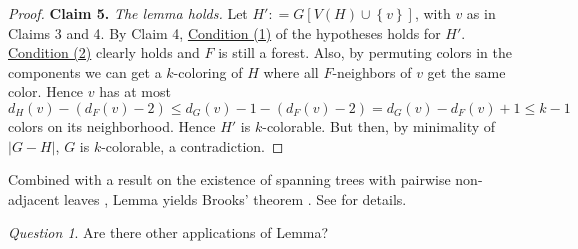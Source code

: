 \documentclass[12pt]{article}
\theoremstyle{plain}
\theoremstyle{definition}
\theoremstyle{remark}
\newtheorem*{question}{Question}
\newcommand{\set}[1]{\left\{ #1 \right\}}
\newcommand{\DefinedAs}{\mathrel{\mathop:}=}
\newcommand{\CondOne}{\hyperref[cond1]{Condition (1)}}
\newcommand{\CondTwo}{\hyperref[cond2]{Condition (2)}}
\begin{document}
\begin{proof}
\textbf{Claim 5.} \textit{The lemma holds.}
Let $H' \DefinedAs G[V(H) \cup \set{v}]$, with $v$ as in Claims 3 and 4.  
By Claim 4, {\CondOne} of the
hypotheses holds for $H'$. {\CondTwo} clearly holds and $F$ is still a forest. Also, by permuting colors in the components we can get a $k$-coloring of $H$ where all $F$-neighbors of $v$ get the same color.  Hence $v$ has at most $d_H(v) - (d_F(v) - 2) \le d_G(v) - 1 - (d_F(v) - 2) = d_G(v) - d_F(v) + 1 \le k-1$ colors on its neighborhood.  Hence $H'$ is $k$-colorable. But then, by minimality of $|G-H|$, $G$ is $k$-colorable, a contradiction.
\end{proof}

Combined with a result on the existence of spanning trees with pairwise non-adjacent leaves \cite{independencytree}, Lemma yields Brooks' theorem \cite{brooks1941colouring}.  See \cite{brooksbeyond} for details.

\begin{question}
Are there other applications of Lemma?
\end{question}



\end{document}
